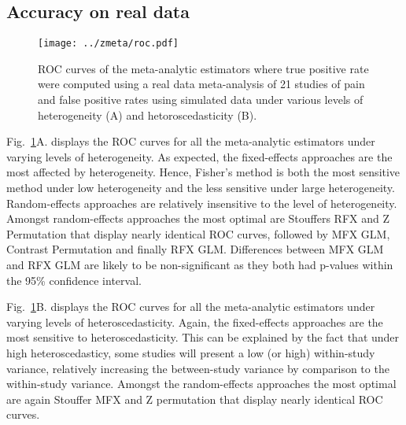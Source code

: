 \documentclass[preprint]{elsarticle}
\begin{document}
\subsection{Accuracy on real data}
\begin{figure}[h]
	\centering
 	\texttt{[image: ../zmeta/roc.pdf]}
	\caption{ROC curves of the meta-analytic estimators where true positive rate were computed using a real data meta-analysis of 21 studies of pain and false positive rates using simulated data under various levels of heterogeneity (A) and hetoroscedasticity (B).}
	\label{fig_realdata}
\end{figure}


Fig.~\ref{fig_realdata}A. displays the ROC curves for all the meta-analytic estimators under varying levels of heterogeneity. As expected, the fixed-effects approaches are the most affected by heterogeneity. Hence, Fisher's method is both the most sensitive method under low heterogeneity and the less sensitive under large heterogeneity. Random-effects approaches are relatively insensitive to the level of heterogeneity. Amongst random-effects approaches the most optimal are Stouffers RFX and Z Permutation that display nearly identical ROC curves, followed by MFX GLM, Contrast Permutation and finally RFX GLM. Differences between MFX GLM and RFX GLM are likely to be non-significant as they both had p-values within the 95\% confidence interval.

Fig.~\ref{fig_realdata}B. displays the ROC curves for all the meta-analytic estimators under varying levels of heteroscedasticity. Again, the fixed-effects approaches are the most sensitive to heteroscedasticity. This can be explained by the fact that under high heteroscedasticy, some studies will present a low (or high) within-study variance, relatively increasing the between-study variance by comparison to the within-study variance. Amongst the random-effects approaches the most optimal are again Stouffer MFX and Z permutation that display nearly identical ROC curves. 

\end{document}
